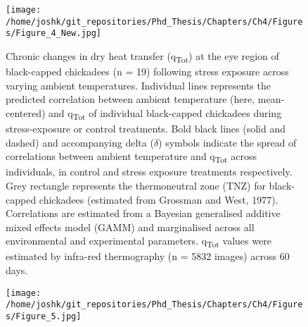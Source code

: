 \documentclass[12pt]{article}
\begin{document}
\begin{figure}[ht]
	\centering
    \captionsetup{width=0.85\linewidth}
	\texttt{[image: /home/joshk/git\_repositories/Phd\_Thesis/Chapters/Ch4/Figures/Figure\_4\_New.jpg]}
    \caption[\hspace{0.5cm}Chronic changes in dry heat transfer (q\textsubscript{Tot}) at the eye region of black-capped chickadees (n = 19) following stress exposure across varying ambient temperatures.]{Chronic changes in dry heat transfer (q\textsubscript{Tot}) at the eye region of black-capped chickadees (n = 19) following stress exposure across varying ambient temperatures. Individual lines represents the predicted correlation between ambient temperature (here, mean-centered) and q\textsubscript{Tot} of individual black-capped chickadees during stress-exposure or control treatments. Bold black lines (solid and dashed) and accompanying delta ($\delta$) symbols indicate the spread of correlations between ambient temperature and q\textsubscript{Tot} across individuals, in control and stress exposure treatments respectively. Grey rectangle represents the thermoneutral zone (TNZ) for black-capped chickadees (estimated from Grossman and West, 1977). Correlations are estimated from a Bayesian generalised additive mixed effects model (GAMM) and marginalised across all environmental and experimental parameters. q\textsubscript{Tot} values were estimated by infra-red thermography (n = 5832 images) across 60 days. 
}
\label{Fig4.4}
\end{figure}
\clearpage 

\begin{figure}[ht]
	\centering
	\texttt{[image: /home/joshk/git\_repositories/Phd\_Thesis/Chapters/Ch4/Figures/Figure\_5.jpg]}
    \captionsetup{labelformat=empty}
    \caption[\hspace{0.5cm}Repeatability of acute and chronic changes in dry heat transfer (q\textsubscript{Tot}) at the eye region during stress exposure in black-capped chickadees (n = 19).]{ }
\label{Fig4.5}
\end{figure}
\clearpage

\vspace{\baselineskip}
\vspace{\baselineskip}
\end{document}
